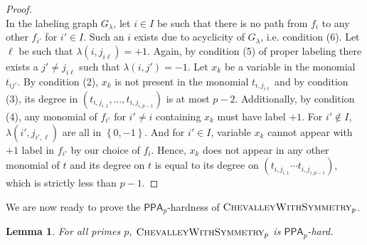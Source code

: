 \documentclass[10pt,a4paper]{article}
\newtheorem{lemma}[theorem]{Lemma}
\theoremstyle{definition}
\theoremstyle{remark}
\def\set#1{\left\{#1\right\}}
\newcommand{\class}[1]{\ensuremath{\mathsf{#1}}\xspace}
\newcommand{\PPAp}{\class{PPA}_{{p}}}
\newcommand{\pnum}{p}
\newcommand{\cChevalleyp}{\textsc{ChevalleyWithSymmetry}_{\pnum}}
\begin{document}
\begin{proof}
\noindent {\em Case 3. $I = \set{i : \lambda(i,j_{i\ell}) = +1 \text{ for some } \ell}$:}\\
In the labeling graph $G_\lambda$, let $i \in I$ be such that there is no path from $f_i$ to any other $f_{i'}$ for $i' \in I$. Such an $i$ exists due to acyclicity of $G_{\lambda}$, i.e. condition (6). Let $\ell$ be such that $\lambda(i,j_{i\ell}) = +1$. Again, by condition (5) of proper labeling there exists a $j' \neq j_{i\ell}$ such that  $\lambda(i,j') = -1$. Let $x_k$ be a variable in the monomial $t_{ij'}$. By condition (2), $x_k$ is not present in the monomial $t_{i,j_{i\ell}}$ and by condition (3), its degree in $(t_{i,j_{i,1}}, \dots, t_{i,j_{i,p-1}})$ is at most $p-2$. Additionally, by condition (4), any monomial of $f_{i'}$ for $i' \neq i$ containing $x_k$ must have label $+1$. For $i' \notin I$, $\lambda(i',j_{i',\ell})$ are all in $\set{0, -1}$. And for $i' \in I$, variable $x_k$ cannot appear with $+1$ label in $f_{i'}$ by our choice of $f_i$. Hence, $x_k$ does not appear in any other monomial of $t$ and its degree on $t$ is equal to its degree on $(t_{i,j_{i,1}} \cdots t_{i,j_{i,p-1}})$, which is strictly less than $p-1$.

\end{proof}


\medskip
\noindent We are now ready to prove the $\PPAp$-hardness of $\cChevalleyp$.

\begin{lemma} \label{lem:combinedChevalleyPPApHardness}
    For all primes $p$, $\cChevalleyp$ is $\PPAp$-hard.
\end{lemma}
\end{document}
